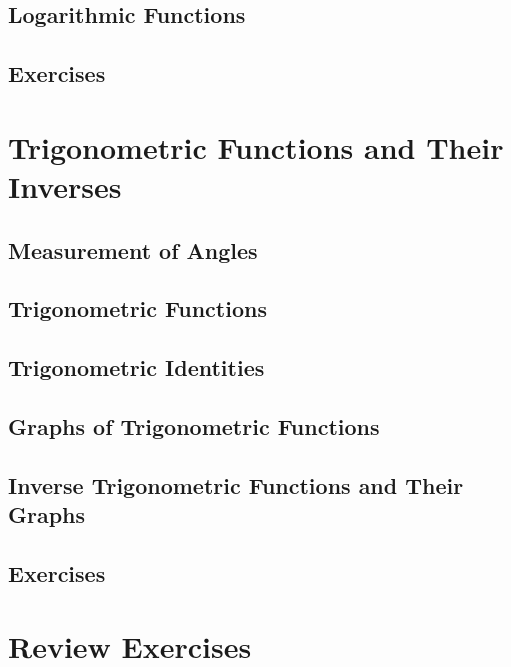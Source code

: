 \documentclass[]{book}
\begin{document}
\subsection{Logarithmic Functions}\label{logarithmic-functions}

\subsection{Exercises}\label{exercises-2}

\section{Trigonometric Functions and Their
Inverses}\label{trigonometric-functions-and-their-inverses}

\subsection{Measurement of Angles}\label{measurement-of-angles}

\subsection{Trigonometric Functions}\label{trigonometric-functions}

\subsection{Trigonometric Identities}\label{trigonometric-identities}

\subsection{Graphs of Trigonometric
Functions}\label{graphs-of-trigonometric-functions}

\subsection{Inverse Trigonometric Functions and Their
Graphs}\label{inverse-trigonometric-functions-and-their-graphs}

\subsection{Exercises}\label{exercises-3}

\section{Review Exercises}\label{review-exercises}
\end{document}
